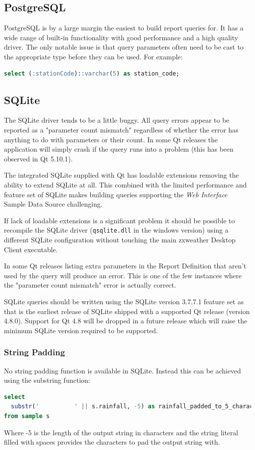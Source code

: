 \documentclass[a4paper,10pt]{book}
\begin{document}
\subsection{PostgreSQL}

PostgreSQL is by a large margin the easiest to build report queries for. It has a wide range of built-in functionality with good performance and a high quality driver. The only notable issue is that query parameters often need to be cast to the appropriate type before they can be used. For example: 

\begin{lstlisting}[language=SQL]
select (:stationCode)::varchar(5) as station_code;
\end{lstlisting}

\subsection{SQLite}
The SQLite driver tends to be a little buggy. All query errors appear to be reported as a "parameter count mismatch" regardless of whether the error has anything to do with parameters or their count. In some Qt releases the application will simply crash if the query runs into a problem (this has been observed in Qt 5.10.1). 

The integrated SQLite supplied with Qt has loadable extensions removing the ability to extend SQLite at all. This combined with the limited performance and feature set of SQLite makes building queries supporting the \emph{Web Interface} Sample Data Source challenging. 

If lack of loadable extensions is a significant problem it should be possible to recompile the SQLite driver (\verb|qsqlite.dll| in the windows version) using a different SQLite configuration without touching the main zxweather Desktop Client executable.

In some Qt releases listing extra parameters in the Report Definition that aren't used by the query will produce an error. This is one of the few instances where the "parameter count mismatch" error is actually correct.

SQLite queries should be written using the SQLite version 3.7.7.1 feature set as that is the earliest release of SQLite shipped with a supported Qt release (version 4.8.0). Support for Qt 4.8 will be dropped in a future release which will raise the minimum SQLite version required to be supported.

\subsubsection{String Padding}
No string padding function is available in SQLite. Instead this can be achieved using the substring function:
\begin{lstlisting}[language=SQL]
select
  substr('          ' || s.rainfall, -5) as rainfall_padded_to_5_characters
from sample s
\end{lstlisting}
Where -5 is the length of the output string in characters and the string literal filled with spaces provides the characters to pad the output string with.
\end{document}
